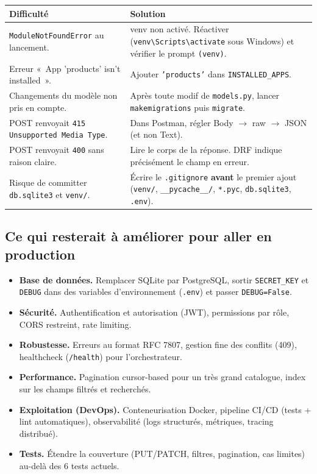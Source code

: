 \documentclass[11pt,a4paper]{article}
\begin{document}
\begin{tabularx}{\textwidth}{@{}p{5.8cm}Y@{}}
\toprule
\textbf{Difficulté} & \textbf{Solution} \\
\midrule
\texttt{ModuleNotFoundError} au lancement. & venv non activé. Réactiver (\texttt{venv\textbackslash Scripts\textbackslash activate} sous Windows) et vérifier le prompt \texttt{(venv)}. \\[4pt]
Erreur «~App 'products' isn't installed~». & Ajouter \texttt{'products'} dans \texttt{INSTALLED\_APPS}. \\[4pt]
Changements du modèle non pris en compte. & Après toute modif de \texttt{models.py}, lancer \texttt{makemigrations} puis \texttt{migrate}. \\[4pt]
POST renvoyait \texttt{415 Unsupported Media Type}. & Dans Postman, régler Body $\rightarrow$ raw $\rightarrow$ JSON (et non Text). \\[4pt]
POST renvoyait \texttt{400} sans raison claire. & Lire le corps de la réponse. DRF indique précisément le champ en erreur. \\[4pt]
Risque de committer \texttt{db.sqlite3} et \texttt{venv/}. & Écrire le \texttt{.gitignore} \textbf{avant} le premier ajout (\texttt{venv/}, \texttt{\_\_pycache\_\_/}, \texttt{*.pyc}, \texttt{db.sqlite3}, \texttt{.env}). \\
\bottomrule
\end{tabularx}

\subsection{Ce qui resterait à améliorer pour aller en production}

\begin{itemize}
  \item \textbf{Base de données.} Remplacer SQLite par PostgreSQL, sortir \texttt{SECRET\_KEY} et \texttt{DEBUG} dans des variables d'environnement (\texttt{.env}) et passer \texttt{DEBUG=False}.
  \item \textbf{Sécurité.} Authentification et autorisation (JWT), permissions par rôle, CORS restreint, rate limiting.
  \item \textbf{Robustesse.} Erreurs au format RFC 7807, gestion fine des conflits (409), healthcheck (\texttt{/health}) pour l'orchestrateur.
  \item \textbf{Performance.} Pagination cursor-based pour un très grand catalogue, index sur les champs filtrés et recherchés.
  \item \textbf{Exploitation (DevOps).} Conteneurisation Docker, pipeline CI/CD (tests + lint automatiques), observabilité (logs structurés, métriques, tracing distribué).
  \item \textbf{Tests.} Étendre la couverture (PUT/PATCH, filtres, pagination, cas limites) au-delà des 6 tests actuels.
\end{itemize}
\end{document}
